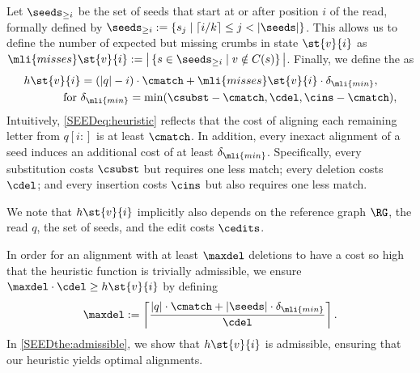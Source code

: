 
%
Let $\seeds_{\ge i}$ be the set of seeds that start at or after position $i$ of
the read, formally defined by $\seeds_{\ge i} := \{s_{j} \mid \lceil i / k
\rceil \leq j < |\seeds|  \}$.
%
This allows us to define the number of expected but missing crumbs in state
$\st{v}{i}$ as $\mli{misses}\st{v}{i} := \big\lvert \left\{  s
\in \seeds_{\ge i} \mid v \notin C(s) \right \} \big\rvert$.
%
Finally, we define the \seedh as
\begin{align} \label{SEEDeq:heuristic}
	h\st{v}{i} &= (\lvert q \rvert - i) \cdot \cmatch + \mli{misses}\st{v}{i} \cdot \delta_\mli{min},\\
	\text{for } &\delta_\mli{min} = \min(\csubst - \cmatch,\cdel,\cins - \cmatch), \label{SEEDeq:delta}
\end{align}
%
Intuitively, \cref{SEEDeq:heuristic} reflects that the cost of aligning each
remaining letter from $q[i{:}]$ is at least $\cmatch$. In addition, every
inexact alignment of a seed induces an additional cost of at least
$\delta_\mli{min}$. 
%
Specifically, every substitution costs $\csubst$ but requires one less match;
every deletion costs $\cdel$; and every insertion costs $\cins$ but also
requires one less match.

We note that $h\st{v}{i}$ implicitly also depends on the reference graph $\RG$,
the read $q$, the set of seeds, and the edit costs $\cedits$.

In order for an alignment with at least $\maxdel$ deletions to have a cost so
high that the heuristic function is trivially admissible, we ensure $\maxdel
\cdot \cdel \geq h\st{v}{i}$ by defining
\begin{align} \label{SEEDeq:maximum-deletions}
	\maxdel := \left\lceil \frac{\lvert q \rvert \cdot \cmatch + |\seeds| \cdot \delta_{\mli{min}}}{\cdel} \right\rceil.
\end{align}
%
In \cref{SEEDthe:admissible}, we show that $h\st{v}{i}$ is admissible, ensuring that
our heuristic yields optimal alignments.


